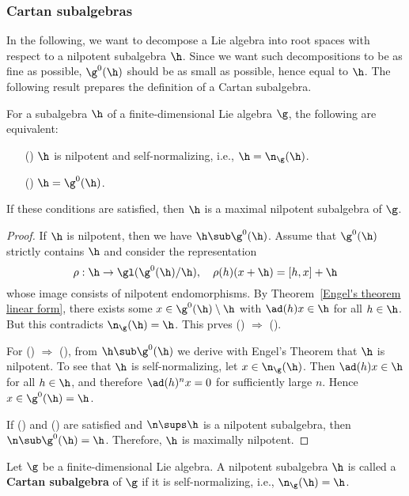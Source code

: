 \subsubsection{Cartan subalgebras}
In the following, we want to decompose a Lie algebra into root spaces with respect to a nilpotent subalgebra $\h$. Since we want such decompositions to be as fine as possible, $\g^0(\h)$ should be as small as possible, hence equal to $\h$. The following result prepares the definition of a Cartan subalgebra.
\begin{proposition}\label{Lie subalgebra Cartan iff}
For a subalgebra $\h$ of a finite-dimensional Lie algebra $\g$, the following are equivalent:
\begin{itemize}
\item[(\rmnum{1})] $\h$ is nilpotent and self-normalizing, i.e., $\h=\n_\g(\h)$.
\item[(\rmnum{2})] $\h=\g^0(\h)$.
\end{itemize}
If these conditions are satisfied, then $\h$ is a maximal nilpotent subalgebra of $\g$.
\end{proposition}
\begin{proof}
If $\h$ is nilpotent, then we have $\h\sub\g^0(\h)$. Assume that $\g^0(\h)$ strictly contains $\h$ and consider the representation
\[\rho:\h\to\gl(\g^0(\h)/\h),\quad\rho(h)(x+\h)=[h,x]+\h\]
whose image consists of nilpotent endomorphisms. By Theorem~\ref{Engel's theorem linear form}, there exists some $x\in\g^0(\h)\setminus\h$ with $\ad(h)x\in\h$ for all $h\in\h$. But this contradicts $\n_{\g}(\h)=\h$. This prves () $\Rightarrow$ ().\par
For () $\Rightarrow$ (), from $\h\sub\g^0(\h)$ we derive with Engel's Theorem that $\h$ is nilpotent. To see that $\h$ is self-normalizing, let $x\in\n_{\g}(\h)$. Then $\ad(h)x\in\h$ for all $h\in\h$, and therefore $\ad(h)^nx=0$ for sufficiently large $n$. Hence $x\in\g^0(\h)=\h$.\par
If () and () are satisfied and $\n\sups\h$ is a nilpotent subalgebra, then $\n\sub\g^0(\h)=\h$. Therefore, $\h$ is maximally nilpotent.
\end{proof}
\begin{definition}
Let $\g$ be a finite-dimensional Lie algebra. A nilpotent subalgebra $\h$ is called a \textbf{Cartan subalgebra} of $\g$ if it is self-normalizing, i.e., $\n_{\g}(\h)=\h$.
\end{definition}
